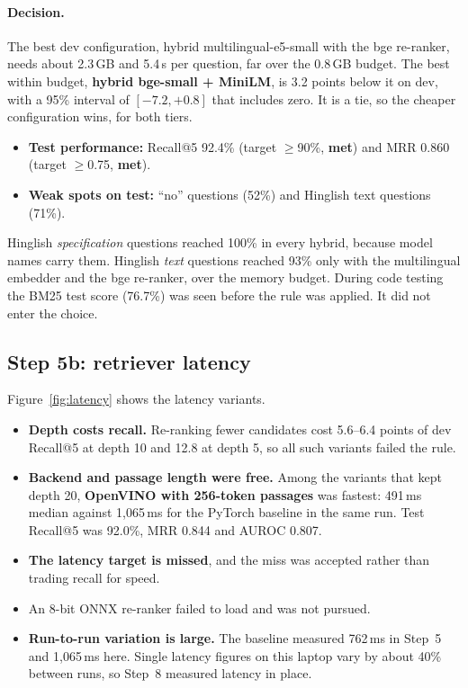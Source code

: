 \documentclass[11pt,a4paper]{article}
\newcommand{\met}{\textcolor{qaqua}{\textbf{met}}}
\begin{document}
\paragraph{Decision.} The best dev configuration, hybrid multilingual-e5-small with the bge re-ranker, needs about
2.3\,GB and 5.4\,s per question, far over the 0.8\,GB budget. The best within budget, \textbf{hybrid bge-small +
MiniLM}, is 3.2 points below it on dev, with a 95\% interval of $[-7.2, +0.8]$ that includes zero. It is a tie, so the
cheaper configuration wins, for both tiers.
\begin{itemize}
  \item \textbf{Test performance:} Recall@5 92.4\% (target $\ge$90\%, \met) and MRR 0.860 (target $\ge$0.75, \met).
  \item \textbf{Weak spots on test:} ``no'' questions (52\%) and Hinglish text questions (71\%).
\end{itemize}
Hinglish \emph{specification} questions reached 100\% in every hybrid, because model names carry them. Hinglish
\emph{text} questions reached 93\% only with the multilingual embedder and the bge re-ranker, over the memory budget. During code
testing the BM25 test score (76.7\%) was seen before the rule was applied. It did not enter the choice.

\subsection{Step 5b: retriever latency}
Figure~\ref{fig:latency} shows the latency variants.
\begin{itemize}
  \item \textbf{Depth costs recall.} Re-ranking fewer candidates cost 5.6--6.4 points of dev Recall@5 at depth 10 and
        12.8 at depth 5, so all such variants failed the rule.
  \item \textbf{Backend and passage length were free.} Among the variants that kept depth 20, \textbf{OpenVINO with
        256-token passages} was fastest: 491\,ms median against 1,065\,ms for the PyTorch baseline in the same run.
        Test Recall@5 was 92.0\%, MRR 0.844 and AUROC 0.807.
  \item \textbf{The latency target is missed}, and the miss was accepted rather than trading recall for speed.
  \item An 8-bit ONNX re-ranker failed to load and was not pursued.
  \item \textbf{Run-to-run variation is large.} The baseline measured 762\,ms in Step~5 and 1,065\,ms here. Single
        latency figures on this laptop vary by about 40\% between runs, so Step~8 measured latency in place.
\end{itemize}
\end{document}
